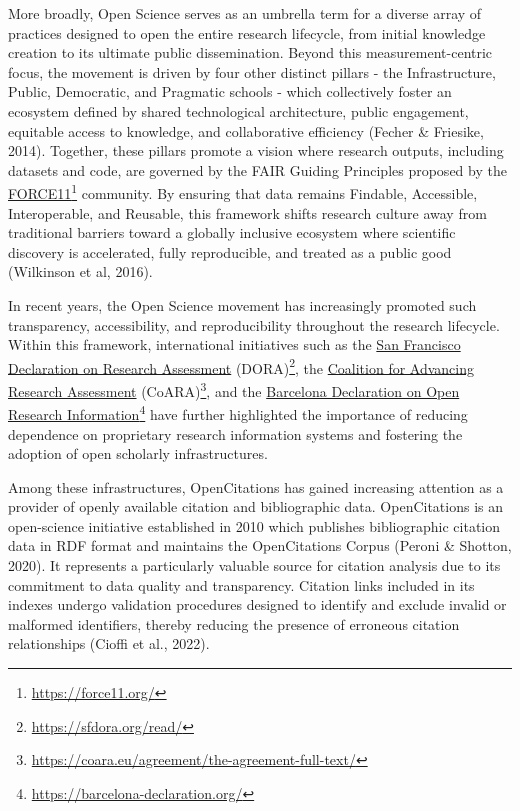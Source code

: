 \documentclass[year=2026]{cup-journal}
\begin{document}
More broadly, Open Science serves as an umbrella term for a diverse array of practices designed to open the entire research lifecycle, from initial knowledge creation to its ultimate public dissemination. Beyond this measurement-centric focus, the movement is driven by four other distinct pillars - the Infrastructure, Public, Democratic, and Pragmatic schools - which collectively foster an ecosystem defined by shared technological architecture, public engagement, equitable access to knowledge, and collaborative efficiency (Fecher \& Friesike, 2014). Together, these pillars promote a vision where research outputs, including datasets and code, are governed by the FAIR Guiding Principles proposed by the \href{https://force11.org/}{FORCE11}\footnote{\url{https://force11.org/}} community. By ensuring that data remains Findable, Accessible, Interoperable, and Reusable, this framework shifts research culture away from traditional barriers toward a globally inclusive ecosystem where scientific discovery is accelerated, fully reproducible, and treated as a public good (Wilkinson et al, 2016).

In recent years, the Open Science movement has increasingly promoted such transparency, accessibility, and reproducibility throughout the research lifecycle. Within this framework, international initiatives such as the \href{https://sfdora.org/read/}{San Francisco Declaration on Research Assessment} (DORA)\footnote{\url{https://sfdora.org/read/}}, the \href{https://coara.eu/agreement/the-agreement-full-text/}{Coalition for Advancing Research Assessment} (CoARA)\footnote{\url{https://coara.eu/agreement/the-agreement-full-text/}}, and the \href{https://barcelona-declaration.org/}{Barcelona Declaration on Open Research Information}\footnote{\url{https://barcelona-declaration.org/}} have further highlighted the importance of reducing dependence on proprietary research information systems and fostering the adoption of open scholarly infrastructures.

Among these infrastructures, OpenCitations has gained increasing attention as a provider of openly available citation and bibliographic data. OpenCitations is an open-science initiative established in 2010 which publishes bibliographic citation data in RDF format and maintains the OpenCitations Corpus (Peroni \& Shotton, 2020). It represents a particularly valuable source for citation analysis due to its commitment to data quality and transparency. Citation links included in its indexes undergo validation procedures designed to identify and exclude invalid or malformed identifiers, thereby reducing the presence of erroneous citation relationships (Cioffi et al., 2022).
\end{document}
